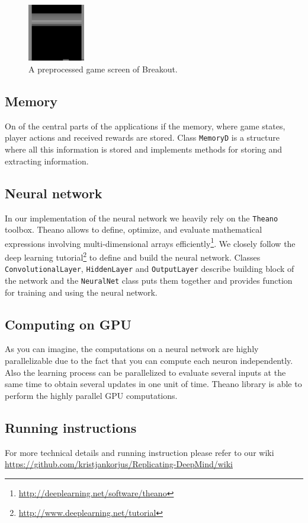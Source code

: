 \documentclass[a4paper,12pt]{article}
\begin{document}
\begin{figure}[h]
\centering
\includegraphics[width=2.5cm]{images/fig_preprocessedscreen.png}
\caption{A preprocessed game screen of Breakout.}
\label{fig:breakoutpreprocessed}
\end{figure}


\subsection{Memory}
On of the central parts of the applications if the memory, where game states, player actions and received rewards are stored. Class \texttt{MemoryD} is a structure where all this information is stored and implements methods for storing and extracting information.


\subsection{Neural network}
In our implementation of the neural network we heavily rely on the \texttt{Theano} toolbox. Theano allows to define, optimize, and evaluate mathematical expressions involving multi-dimensional arrays efficiently\footnote{\url{http://deeplearning.net/software/theano}}. We closely follow the deep learning tutorial\footnote{\url{http://www.deeplearning.net/tutorial}} to define and build the neural network. Classes \texttt{ConvolutionalLayer}, \texttt{HiddenLayer} and \texttt{OutputLayer} describe building block of the network and the \texttt{NeuralNet} class puts them together and provides function for training and using the neural network.

\subsection{Computing on GPU}
As you can imagine, the computations on a neural network are highly parallelizable due to the fact that you can compute each neuron independently. Also the learning process can be parallelized to evaluate several inputs at the same time to obtain several updates in one unit of time. Theano library is able to perform the highly parallel GPU computations.

\subsection{Running instructions}
For more technical details and running instruction please refer to our wiki \url{https://github.com/kristjankorjus/Replicating-DeepMind/wiki}
\end{document}
